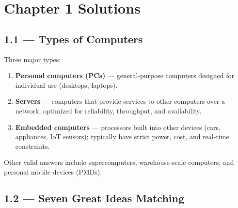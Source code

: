 \newpage
\section*{Chapter 1 Solutions}

\subsection*{1.1 --- Types of Computers}
\hypertarget{sol-1.1}{}

Three major types:

\begin{enumerate}
  \item \textbf{Personal computers (PCs)} --- general-purpose computers
        designed for individual use (desktops, laptops).
  \item \textbf{Servers} --- computers that provide services to other
        computers over a network; optimized for reliability, throughput, and
        availability.
  \item \textbf{Embedded computers} --- processors built into other devices
        (cars, appliances, IoT sensors); typically have strict power, cost,
        and real-time constraints.
\end{enumerate}

Other valid answers include supercomputers, warehouse-scale computers, and
personal mobile devices (PMDs).

\subsection*{1.2 --- Seven Great Ideas Matching}
\hypertarget{sol-1.2}{}

